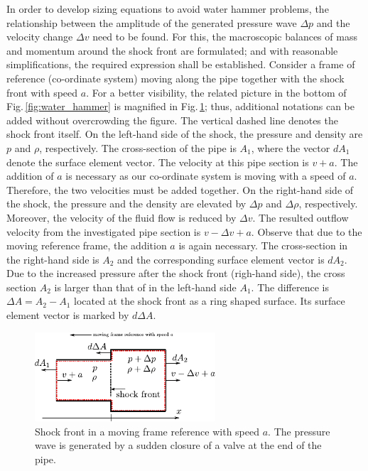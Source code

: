 In order to develop sizing equations to avoid water hammer problems, the relationship between the amplitude of the generated pressure wave $\Delta p$ and the velocity change $\Delta v$ need to be found. For this, the macroscopic balances of mass and momentum around the shock front are formulated; and with reasonable simplifications, the required expression shall be established. Consider a frame of reference (co-ordinate system) moving along the pipe together with the shock front with speed $a$. For a better visibility, the related picture in the bottom of Fig.\,\ref{fig:water_hammer} is magnified in Fig.\,\ref{fig:allievi_principle}; thus, additional notations can be added without overcrowding the figure. The vertical dashed line denotes the shock front itself. On the left-hand side of the shock, the pressure and density are $p$ and $\rho$, respectively. The cross-section of the pipe is $A_1$, where the vector $dA_1$ denote the surface element vector. The velocity at this pipe section is $v+a$. The addition of $a$ is necessary as our co-ordinate system is moving with a speed of $a$. Therefore, the two velocities must be added together. On the right-hand side of the shock, the pressure and the density are elevated by $\Delta p$ and $\Delta \rho$, respectively. Moreover, the velocity of the fluid flow is reduced by $\Delta v$. The resulted outflow velocity from the investigated pipe section is $v-\Delta v + a$. Observe that due to the moving reference frame, the addition $a$ is again necessary. The cross-section in the right-hand side is $A_2$ and the corresponding surface element vector is $dA_2$. Due to the increased pressure after the shock front (righ-hand side), the cross section $A_2$ is larger than that of in the left-hand side $A_1$. The difference is $\Delta A = A_2 - A_1$ located at the shock front as a ring shaped surface. Its surface element vector is marked by $d\Delta A$.

\begin{figure}[h!]
\centering
\includegraphics[width=0.6\textwidth]{figs/WaterHammer_AllieviPrinciple.pdf}
\caption{\label{fig:allievi_principle}Shock front in a moving frame reference with speed $a$. The pressure wave is generated by a sudden closure of a valve at the end of the pipe.}
\end{figure}

